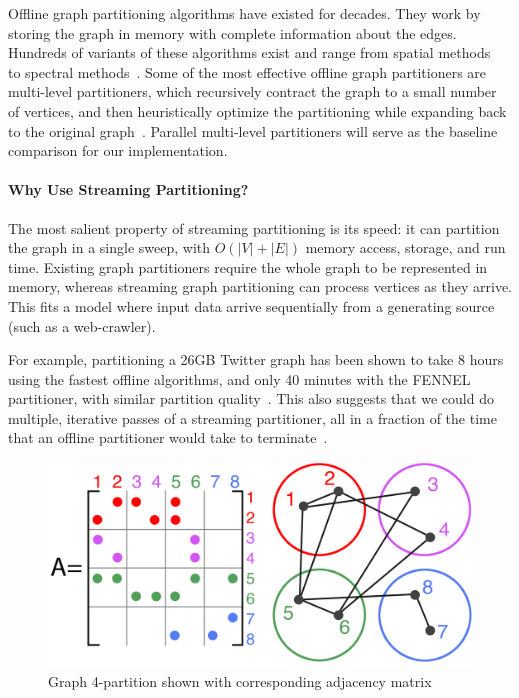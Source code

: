 Offline graph partitioning algorithms have existed for decades. They work by storing the graph in memory with complete information about the edges. Hundreds of variants of these algorithms exist and range from spatial methods~\cite{Gilbert95geometricmesh} to spectral methods~\cite{arora2009expander}. Some of the most effective offline graph partitioners are multi-level partitioners, which recursively contract the graph to a small number of vertices, and then heuristically optimize the partitioning while expanding back to the original graph~\cite{karypis1998multilevel}. Parallel multi-level partitioners will serve as the baseline comparison for our implementation. 



\paragraph{Why Use Streaming Partitioning?}
The most salient property of streaming partitioning is its speed: it can partition the graph in a single sweep, with $O(|V| + |E|)$ memory access, storage, and run time. Existing graph partitioners require the whole graph to be represented in memory, whereas streaming graph partitioning can process vertices as they arrive. This fits a model where input data arrive sequentially from a generating source (such as a web-crawler).

For example, partitioning a 26GB Twitter graph has been shown to take 8 hours using the fastest offline algorithms, and only 40 minutes with the FENNEL partitioner, with similar partition quality~\cite{tsourakakis2012fennel}. This also suggests that we could do multiple, iterative passes of a streaming partitioner, all in a fraction of the time that an offline partitioner would take to terminate~\cite{nishimura2013restream}.


\begin{figure}[h]
\centering
\includegraphics[width=0.85\columnwidth] {figures/graphpart1.png}
\caption[Caption for]{Graph 4-partition shown with corresponding adjacency matrix}
\label{fig:0}
\end{figure}

